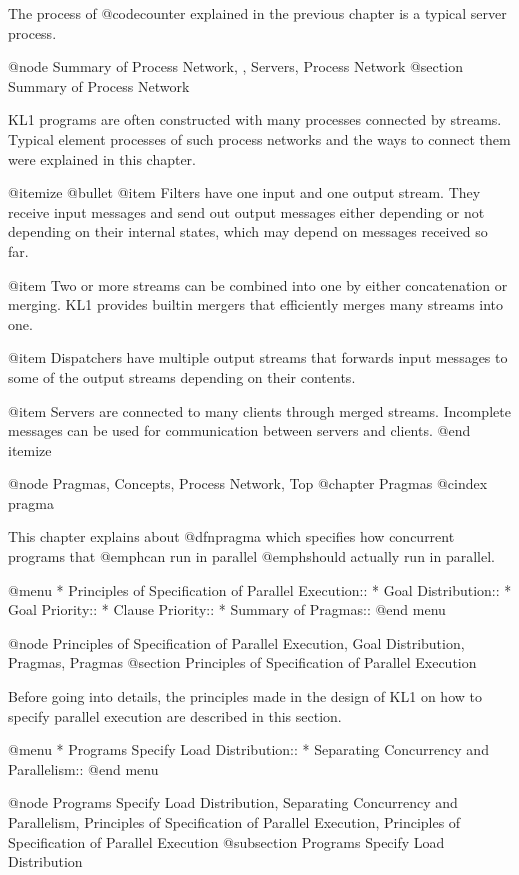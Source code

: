 {The process of @code{counter} explained in the previous chapter is a
typical server process.

@node Summary of Process Network,  , Servers, Process Network
@section Summary of Process Network

KL1 programs are often constructed with many processes connected by
streams.  Typical element processes of such process networks and the
ways to connect them were explained in this chapter.

@itemize @bullet
@item
Filters have one input and one output stream.  They receive input
messages and send out output messages either depending or not depending
on their internal states, which may depend on messages received so far.

@item
Two or more streams can be combined into one by either concatenation or
merging.  KL1 provides builtin mergers that efficiently merges many
streams into one.

@item
Dispatchers have multiple output streams that forwards input messages to
some of the output streams depending on their contents.

@item
Servers are connected to many clients through merged streams.
Incomplete messages can be used for communication between servers and
clients.
@end itemize

@node Pragmas, Concepts, Process Network, Top
@chapter Pragmas
@cindex pragma

This chapter explains about @dfn{pragma} which specifies how concurrent
programs that @emph{can run} in parallel @emph{should actually run} in
parallel.

@menu
* Principles of Specification of Parallel Execution::  
* Goal Distribution::           
* Goal Priority::               
* Clause Priority::             
* Summary of Pragmas::          
@end menu

@node Principles of Specification of Parallel Execution, Goal Distribution, Pragmas, Pragmas
@section Principles of Specification of Parallel Execution

Before going into details, the principles made in the design of KL1 on
how to specify parallel execution are described in this section.

@menu
* Programs Specify Load Distribution::  
* Separating Concurrency and Parallelism::  
@end menu

@node Programs Specify Load Distribution, Separating Concurrency and Parallelism, Principles of Specification of Parallel Execution, Principles of Specification of Parallel Execution
@subsection Programs Specify Load Distribution

}
